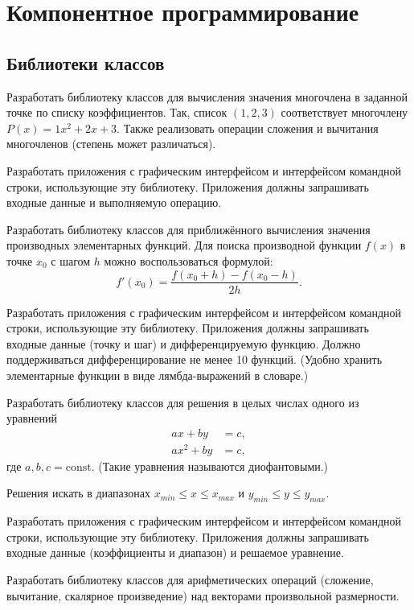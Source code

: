 \section{Компонентное программирование}

\subsection{Библиотеки классов}

\task Разработать библиотеку классов для вычисления значения
многочлена в заданной точке по списку коэффициентов. Так, список
$(1, 2, 3)$ соответствует многочлену $P(x)=1x^2+2x+3.$ Также
реализовать операции сложения и вычитания многочленов (степень может
различаться).

Разработать приложения с графическим интерфейсом и интерфейсом
командной строки, использующие эту библиотеку. Приложения должны
запрашивать входные данные и выполняемую операцию.

\task Разработать библиотеку классов для приближённого вычисления
значения производных элементарных функций. Для поиска производной
функции $f(x)$ в точке $x_0$ с шагом $h$ можно воспользоваться
формулой:
\[
f'(x_0) = \frac{f(x_0+h) - f(x_0-h)}{2h}.
\]

Разработать приложения с графическим интерфейсом и интерфейсом
командной строки, использующие эту библиотеку. Приложения должны
запрашивать входные данные (точку и шаг) и дифференцируемую
функцию. Должно поддерживаться дифференцирование не менее 10
функций. (Удобно хранить элементарные функции в виде лямбда-выражений
в словаре.)

\task Разработать библиотеку классов для решения в целых числах
одного из уравнений
\begin{align*}
a x + b y &= c,\\
a x^2 + b y &= c,
\end{align*}
где $a, b, c = \mathrm{const}.$ (Такие уравнения называются
диофантовыми.)

Решения искать в диапазонах $x_{min}\leqslant x \leqslant x_{max}$ и
$y_{min}\leqslant y \leqslant y_{max}.$

Разработать приложения с графическим интерфейсом и интерфейсом
командной строки, использующие эту библиотеку. Приложения должны
запрашивать входные данные (коэффициенты и диапазон) и решаемое
уравнение.

\task Разработать библиотеку классов для арифметических операций
(сложение, вычитание, скалярное произведение) над векторами
произвольной размерности.


